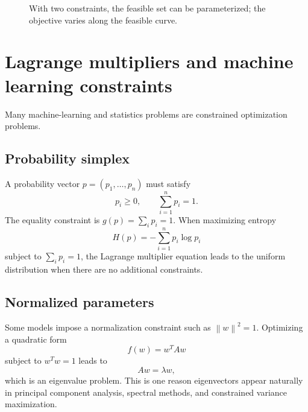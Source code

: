 \documentclass[11pt]{article}
\newcommand{\norm}[1]{\left\lVert #1\right\rVert}
\begin{document}
\begin{figure}[H]
\centering
{}
\caption{With two constraints, the feasible set can be parameterized; the objective varies along the feasible curve.}
\end{figure}

\section{Lagrange multipliers and machine learning constraints}

Many machine-learning and statistics problems are constrained optimization problems.

\subsection*{Probability simplex}
A probability vector $p=(p_1,\dots,p_n)$ must satisfy
\[
p_i\ge 0,
\qquad
\sum_{i=1}^n p_i=1.
\]
The equality constraint is $g(p)=\sum_i p_i=1$. When maximizing entropy
\[
H(p)=-\sum_{i=1}^n p_i\log p_i
\]
subject to $\sum_i p_i=1$, the Lagrange multiplier equation leads to the uniform distribution when there are no additional constraints.

\subsection*{Normalized parameters}
Some models impose a normalization constraint such as $\norm{w}^2=1$. Optimizing a quadratic form
\[
f(w)=w^T A w
\]
subject to $w^T w=1$ leads to
\[
Aw=\lambda w,
\]
which is an eigenvalue problem. This is one reason eigenvectors appear naturally in principal component analysis, spectral methods, and constrained variance maximization.
\end{document}
